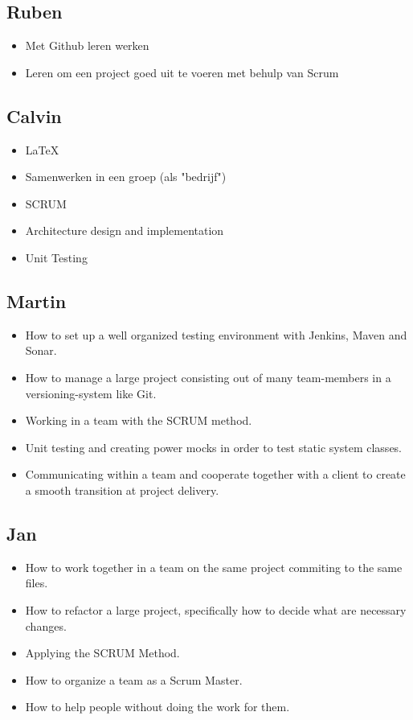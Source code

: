 \documentclass{article}
\begin{document}
\subsection*{Ruben}
\begin{itemize}
	\item Met Github leren werken
	\item Leren om een project goed uit te voeren met behulp van Scrum
\end{itemize}
\subsection*{Calvin}
\begin{itemize}
 	\item \LaTeX
	\item Samenwerken in een groep (als "bedrijf")
	\item SCRUM
	\item Architecture design and  implementation
	\item Unit Testing
\end{itemize}
\subsection*{Martin}
\begin{itemize}
  \item How to set up a well organized testing environment with Jenkins, Maven and Sonar.
  \item How to manage a large project consisting out of many team-members in a versioning-system like Git.
  \item Working in a team with the SCRUM method.
  \item Unit testing and creating power mocks in order to test static system classes.
  \item Communicating within a team and cooperate together with a client to create a smooth transition at project delivery.
\end{itemize}
\subsection*{Jan}
\begin{itemize}
	\item How to work together in a team on the same project commiting to the same files.
	\item How to refactor a large project, specifically how to decide what are necessary changes.
	\item Applying the SCRUM Method.
	\item How to organize a team as a Scrum Master.
	\item How to help people without doing the work for them.
\end{itemize}
\end{document}
